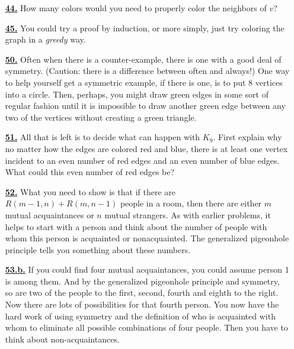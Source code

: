 \documentclass[10pt,]{book}
\theoremstyle{plain}
\theoremstyle{definition}
\theoremstyle{definition}
\theoremstyle{definition}
\numberwithin{equation}{chapter}
\begin{document}
\begin{itemize}[itemsep=1em]
\hypertarget{a-44}{}\item[\textbf{\hyperref[activity-37]{44.}}]
\hypertarget{p-387}{}%
How many colors would you need to properly color the neighbors of \(v\)?%

\hypertarget{a-45}{}\item[\textbf{\hyperref[activity-38]{45.}}]
\hypertarget{p-390}{}%
You could try a proof by induction, or more simply, just try coloring the graph in a \emph{greedy} way.%

\hypertarget{a-50}{}\item[\textbf{\hyperref[activity-43]{50.}}]
\hypertarget{p-414}{}%
Often when there is a counter-example, there is one with a good deal of symmetry. (Caution: there is a difference between often and always!) One way to help yourself get a symmetric example, if there is one, is to put 8 vertices into a circle. Then, perhaps, you might draw green edges in some sort of regular fashion until it is impossible to draw another green edge between any two of the vertices without creating a green triangle.%

\hypertarget{a-51}{}\item[\textbf{\hyperref[activity-44]{51.}}]
\hypertarget{p-416}{}%
All that is left is to decide what can happen with \(K_9\).  First explain why no matter how the edges are colored red and blue, there is at least one vertex incident to an even number of red edges and an even number of blue edges.  What could this even number of red edges be?%

\hypertarget{a-52}{}\item[\textbf{\hyperref[Ramseyrecurrence]{52.}}]
\hypertarget{p-420}{}%
What you need to show is that if there are \(R(m - 1, n) + R(m, n - 1)\) people in a room, then there are either \(m\) mutual acquaintances or \(n\) mutual strangers. As with earlier problems, it helps to start with a person and think about the number of people with whom this person is acquainted or nonacquainted. The generalized pigeonhole principle tells you something about these numbers.%

\hypertarget{a-53.b}{}\item[\textbf{\hyperref[task-59]{53.b.}}]
\hypertarget{p-425}{}%
If you could find four mutual acquaintances, you could assume person 1 is among them. And by the generalized pigeonhole principle and symmetry, so are two of the people to the first, second, fourth and eighth to the right. Now there are lots of possibilities for that fourth person. You now have the hard work of using symmetry and the definition of who is acquainted with whom to eliminate all possible combinations of four people. Then you have to think about non-acquaintances.%


\end{itemize}
\end{document}
